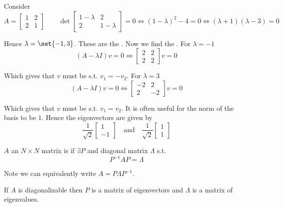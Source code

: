 \documentclass{article}
\begin{document}
\begin{example}
  Consider
  \[
    A = \left[\begin{matrix}
        1 & 2 \\ 2 & 1
    \end{matrix}\right]
    \quad\quad
    \det
    \left[\begin{matrix}
        1 - \lambda & 2 \\ 2 & 1 - \lambda
    \end{matrix}\right]
    = 0
    \iff
    (1 - \lambda)^2 - 4 = 0
    \iff
    (\lambda + 1)(\lambda - 3) = 0
  \]

  Hence $\lambda = \set{-1, 3}$. These are the . Now we find the . For $\lambda = -1$
  \[
    (A - \lambda I)v = 0
    \iff
    \left[\begin{matrix}
        2 & 2 \\ 2 & 2
    \end{matrix}\right] v = 0
  \]

  Which gives that $v$ must be s.t. $v_1 = -v_2$. For $\lambda = 3$
  \[
    (A - \lambda I)v = 0
    \iff
    \left[\begin{matrix}
        -2 & 2 \\ 2 & -2
    \end{matrix}\right] v = 0
  \]

  Which gives that $v$ must be s.t. $v_1 = v_2$. It is often useful for the norm of the basis to be $1$. Hence the eigenvectors are given by
  \[
    \dfrac{1}{\sqrt{2}}
    \left[\begin{matrix}
      1 \\ -1
    \end{matrix}\right]
    \quad\text{and}\quad
    \dfrac{1}{\sqrt{2}}
    \left[\begin{matrix}
      1 \\ 1
    \end{matrix}\right]
  \]
\end{example}

\begin{definition}
  $A$ an $N \times N$ matrix is  if $\exists P$ and diagonal matrix $\Lambda$ s.t.
  \[
    P^{-1} A P = \Lambda
  \]

  Note we can equivalently write $A = P \Lambda P^{-1}$.
\end{definition}

\begin{claim}
  If $A$ is diagonalizable then $P$ is a matrix of eigenvectors and $\Lambda$ is a matrix of eigenvalues.
\end{claim}
\end{document}
